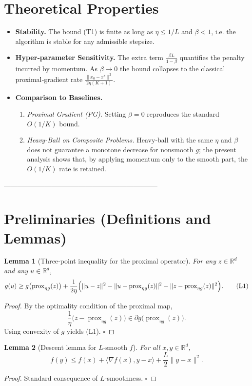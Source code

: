 \documentclass{article}
\newtheorem{lemma}{Lemma}
\newcommand{\prox}{\operatorname{prox}}
\newcommand{\R}{\mathbb{R}}
\newcommand{\inner}[2]{\langle #1,#2\rangle}
\newcommand{\norm}[1]{\|#1\|}
\begin{document}
\section*{Theoretical Properties}
\begin{itemize}
    \item \textbf{Stability.} The bound (T1) is finite as long as $\eta\le1/L$ and $\beta<1$, i.e. the algorithm is stable for any admissible stepsize.
    \item \textbf{Hyper‑parameter Sensitivity.} The extra term $\frac{\beta L}{1-\beta}$ quantifies the penalty incurred by momentum. As $\beta\to0$ the bound collapses to the classical proximal‑gradient rate $\frac{\norm{x_{0}-x^{\star}}^{2}}{2\eta(K+1)}$.
    \item \textbf{Comparison to Baselines.}  
        \begin{enumerate}
            \item \emph{Proximal Gradient (PG).} Setting $\beta=0$ reproduces the standard $O(1/K)$ bound.
            \item \emph{Heavy‑Ball on Composite Problems.} Heavy‑ball with the same $\eta$ and $\beta$ does not guarantee a monotone decrease for nonsmooth $g$; the present analysis shows that, by applying momentum only to the smooth part, the $O(1/K)$ rate is retained.
        \end{enumerate}
\end{itemize}

--------------------------------------------------------------------

\section*{Preliminaries (Definitions and Lemmas)}
\begin{lemma}[Three‑point inequality for the proximal operator]\label{lem:prox}
For any $z\in\R^{d}$ and any $u\in\R^{d}$,
\[
g(u)\ge g\bigl(\prox_{\eta g}(z)\bigr)+\frac1{2\eta}\Bigl(\norm{u-z}^{2}-\norm{u-\prox_{\eta g}(z)}^{2}-\norm{z-\prox_{\eta g}(z)}^{2}\Bigr).
\tag{L1}
\]
\end{lemma}
\begin{proof}
By the optimality condition of the proximal map,
\[
\frac{1}{\eta}\bigl(z-\prox_{\eta g}(z)\bigr)\in\partial g\bigl(\prox_{\eta g}(z)\bigr).
\]
Using convexity of $g$ yields (L1). \hfill $\square$
\end{proof}

\begin{lemma}[Descent lemma for $L$‑smooth $f$]\label{lem:smooth}
For all $x,y\in\R^{d}$,
\[
f(y)\le f(x)+\inner{\nabla f(x)}{y-x}+\frac{L}{2}\norm{y-x}^{2}.
\tag{L2}
\]
\end{lemma}
\begin{proof}
Standard consequence of $L$‑smoothness. \hfill $\square$
\end{proof}
\end{document}
